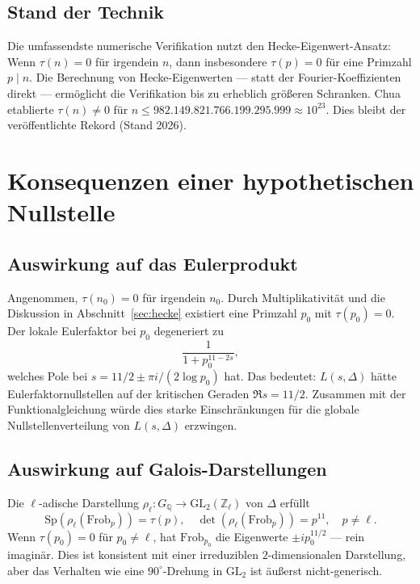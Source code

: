 \documentclass[12pt,a4paper]{amsart}
\theoremstyle{definition}
\begin{document}
\subsection{Stand der Technik}

Die umfassendste numerische Verifikation nutzt den Hecke-Eigenwert-Ansatz: Wenn
$\tau(n) = 0$ für irgendein $n$, dann insbesondere $\tau(p) = 0$ für eine Primzahl
$p \mid n$. Die Berechnung von Hecke-Eigenwerten --- statt der Fourier-Koeffizienten
direkt --- ermöglicht die Verifikation bis zu erheblich größeren Schranken. Chua
\cite{Chua2004} etablierte $\tau(n) \neq 0$ für
$n \leq 982{.}149{.}821{.}766{.}199{.}295{.}999 \approx 10^{23}$.
Dies bleibt der veröffentlichte Rekord (Stand 2026).

\section{Konsequenzen einer hypothetischen Nullstelle}

\subsection{Auswirkung auf das Eulerprodukt}

Angenommen, $\tau(n_0) = 0$ für irgendein $n_0$. Durch Multiplikativität und die
Diskussion in Abschnitt~\ref{sec:hecke} existiert eine Primzahl $p_0$ mit
$\tau(p_0) = 0$. Der lokale Eulerfaktor bei $p_0$ degeneriert zu
\[
  \frac{1}{1 + p_0^{11-2s}},
\]
welches Pole bei $s = 11/2 \pm \pi i / (2 \log p_0)$ hat. Das bedeutet:
$L(s, \Delta)$ hätte Eulerfaktornullstellen auf der kritischen Geraden
$\Re s = 11/2$. Zusammen mit der Funktionalgleichung würde dies starke
Einschränkungen für die globale Nullstellenverteilung von $L(s, \Delta)$ erzwingen.

\subsection{Auswirkung auf Galois-Darstellungen}

Die $\ell$-adische Darstellung $\rho_\ell : G_\mathbb{Q} \to \mathrm{GL}_2(\mathbb{Z}_\ell)$
von $\Delta$ erfüllt
\[
  \mathrm{Sp}(\rho_\ell(\mathrm{Frob}_p)) = \tau(p), \quad
  \det(\rho_\ell(\mathrm{Frob}_p)) = p^{11},
  \quad p \neq \ell.
\]
Wenn $\tau(p_0) = 0$ für $p_0 \neq \ell$, hat $\mathrm{Frob}_{p_0}$ die
Eigenwerte $\pm i p_0^{11/2}$ --- rein imaginär. Dies ist konsistent mit einer
irreduziblen $2$-dimensionalen Darstellung, aber das Verhalten wie eine
$90^\circ$-Drehung in $\mathrm{GL}_2$ ist äußerst nicht-generisch.
\end{document}
